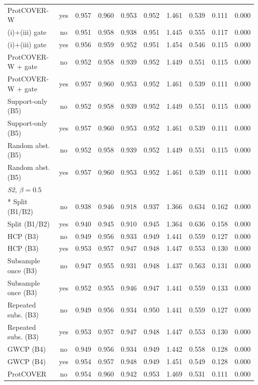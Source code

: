 \begin{longtable}{lccccccccc}
ProtCOVER-W & yes & 0.957 & 0.960 & 0.953 & 0.952 & 1.461 & 0.539 & 0.111 & 0.000 \\
(i)+(iii) gate & no & 0.951 & 0.958 & 0.938 & 0.951 & 1.445 & 0.555 & 0.117 & 0.000 \\
(i)+(iii) gate & yes & 0.956 & 0.959 & 0.952 & 0.951 & 1.454 & 0.546 & 0.115 & 0.000 \\
ProtCOVER-W + gate & no & 0.952 & 0.958 & 0.939 & 0.952 & 1.449 & 0.551 & 0.115 & 0.000 \\
ProtCOVER-W + gate & yes & 0.957 & 0.960 & 0.953 & 0.952 & 1.461 & 0.539 & 0.111 & 0.000 \\
Support-only (B5) & no & 0.952 & 0.958 & 0.939 & 0.952 & 1.449 & 0.551 & 0.115 & 0.000 \\
Support-only (B5) & yes & 0.957 & 0.960 & 0.953 & 0.952 & 1.461 & 0.539 & 0.111 & 0.000 \\
Random abst. (B5) & no & 0.952 & 0.958 & 0.939 & 0.952 & 1.449 & 0.551 & 0.115 & 0.000 \\
Random abst. (B5) & yes & 0.957 & 0.960 & 0.953 & 0.952 & 1.461 & 0.539 & 0.111 & 0.000 \\
\midrule
\multicolumn{10}{l}{\emph{S2, $\beta=0.5$}}\\*
Split (B1/B2) & no & 0.938 & 0.946 & 0.918 & 0.937 & 1.366 & 0.634 & 0.162 & 0.000 \\
Split (B1/B2) & yes & 0.940 & 0.945 & 0.910 & 0.945 & 1.364 & 0.636 & 0.158 & 0.000 \\
HCP (B3) & no & 0.949 & 0.956 & 0.933 & 0.949 & 1.441 & 0.559 & 0.127 & 0.000 \\
HCP (B3) & yes & 0.953 & 0.957 & 0.947 & 0.948 & 1.447 & 0.553 & 0.130 & 0.000 \\
Subsample once (B3) & no & 0.947 & 0.955 & 0.931 & 0.948 & 1.437 & 0.563 & 0.131 & 0.000 \\
Subsample once (B3) & yes & 0.952 & 0.955 & 0.946 & 0.947 & 1.441 & 0.559 & 0.133 & 0.000 \\
Repeated subs. (B3) & no & 0.949 & 0.956 & 0.934 & 0.950 & 1.441 & 0.559 & 0.127 & 0.000 \\
Repeated subs. (B3) & yes & 0.953 & 0.957 & 0.947 & 0.948 & 1.447 & 0.553 & 0.130 & 0.000 \\
GWCP (B4) & no & 0.949 & 0.956 & 0.934 & 0.949 & 1.442 & 0.558 & 0.128 & 0.000 \\
GWCP (B4) & yes & 0.954 & 0.957 & 0.948 & 0.949 & 1.451 & 0.549 & 0.128 & 0.000 \\
ProtCOVER & no & 0.954 & 0.960 & 0.942 & 0.953 & 1.469 & 0.531 & 0.111 & 0.000 \\

\end{longtable}
